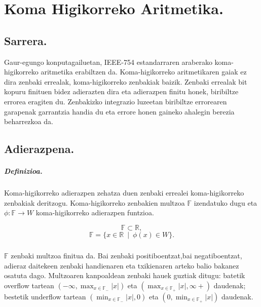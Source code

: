 \chapter{Koma Higikorreko Aritmetika.}

\section{Sarrera.}

Gaur-egungo konputagailuetan, IEEE-754 estandarraren araberako koma-higikorreko aritmetika erabiltzen da. Koma-higikorreko aritmetikaren gaiak ez dira zenbaki errealak, koma-higikorreko zenbakiak baizik. Zenbaki errealak bit kopuru finituen bidez adierazten dira eta adierazpen finitu honek, biribiltze errorea eragiten du. Zenbakizko integrazio luzeetan  biribiltze errorearen garapenak garrantzia handia du eta errore honen gaineko ahalegin berezia beharrezkoa da.    

\section{Adierazpena.}

\paragraph*{\textbf{Definizioa.}} Koma-higikorreko adierazpen zehatza duen zenbaki errealei koma-higikorreko zenbakiak deritzogu. Koma-higikorreko zenbakien multzoa ${\mathbb{F}}$ izendatuko dugu eta $\phi:\mathbb{F} \rightarrow W$ koma-higikorreko adierazpen funtzioa. 

\begin{equation*}
\mathbb{F}\subset \mathbb{R},
\end{equation*}
\begin{equation}
\mathbb{F}=\{x \in \mathbb{R} \ \mid \ \phi(x) \in W\}.
\end{equation}

\paragraph*{}$\mathbb{F}$ zenbaki multzoa finitua da. Bai zenbaki positiboentzat,bai negatiboentzat, adieraz daitekeen zenbaki handienaren eta txikienaren arteko balio bakanez osatuta dago. Multzoaren kanpoaldean zenbaki hauek guztiak ditugu: batetik overflow tartean $(-\infty,\max_{x \in \mathbb{F_{-}}}|x|)$  eta $(\max_{x \in \mathbb{F_{+}}}|x|,\infty+)$ daudenak; bestetik underflow tartean  $(\min_{x \in \mathbb{F_{-}}}|x|,0)$ eta $(0,\min_{x \in \mathbb{F_{+}}}|x|)$ daudenak. 

